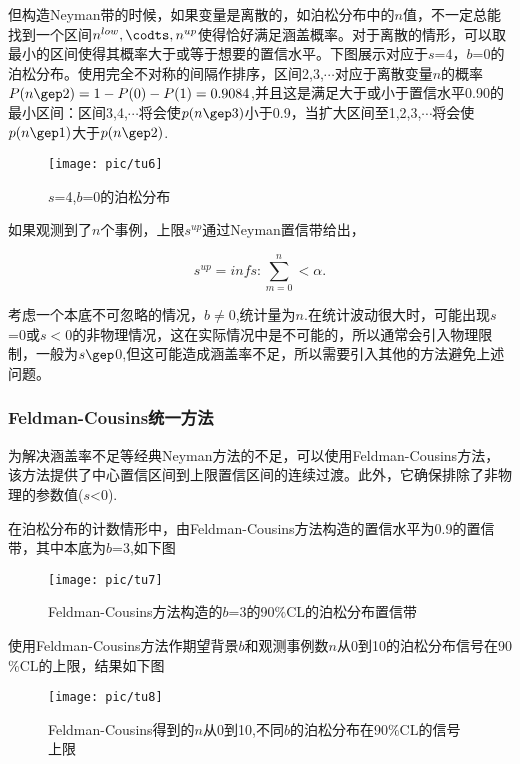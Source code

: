 但构造Neyman带的时候，如果变量是离散的，如泊松分布中的$n$值，不一定总能找到一个区间{$n^{low},\codts,n^{up}$}使得恰好满足涵盖概率。对于离散的情形，可以取最小的区间使得其概率大于或等于想要的置信水平。下图展示对应于$s$=4，$b$=0的泊松分布。使用完全不对称的间隔作排序，区间{2,3,$\cdots$}对应于离散变量$n$的概率$P(n\gep 2)=1-P(0)-P(1)=0.9084$,并且这是满足大于或小于置信水平0.90的最小区间：区间{3,4,$\cdots$}将会使$p(n\gep 3)$小于0.9，当扩大区间至{1,2,3,$\cdots$}将会使$p(n\gep 1)$大于$p(n\gep 2)$.

\begin{figure}[ht]
	\centering
	\texttt{[image: pic/tu6]}
	\caption{$s$=4,$b$=0的泊松分布}
	\label{fig:6}
\end{figure}

如果观测到了$n$个事例，上限$s^{up}$通过Neyman置信带给出，

\begin{equation}\label{key}
s^{up}=inf{s:\sum_{m=0}^{n}<\alpha}.
\end{equation}

考虑一个本底不可忽略的情况，$b\neq$0,统计量为$n$.在统计波动很大时，可能出现$s$=0或$s<$0的非物理情况，这在实际情况中是不可能的，所以通常会引入物理限制，一般为$s\gep$0,但这可能造成涵盖率不足，所以需要引入其他的方法避免上述问题。

\subsubsection{Feldman-Cousins统一方法}

为解决涵盖率不足等经典Neyman方法的不足，可以使用Feldman-Cousins方法，该方法提供了中心置信区间到上限置信区间的连续过渡。此外，它确保排除了非物理的参数值($s$<0).

在泊松分布的计数情形中，由Feldman-Cousins方法构造的置信水平为0.9的置信带，其中本底为$b$=3,如下图

\begin{figure}[ht]
	\centering
	\texttt{[image: pic/tu7]}
	\caption{Feldman-Cousins方法构造的$b$=3的90$\%$CL的泊松分布置信带}
	\label{fig:7}
\end{figure}

使用Feldman-Cousins方法作期望背景$b$和观测事例数$n$从0到10的泊松分布信号在90$\%$CL的上限，结果如下图

\begin{figure}[ht]
	\centering
	\texttt{[image: pic/tu8]}
	\caption{Feldman-Cousins得到的$n$从0到10,不同$b$的泊松分布在90$\%$CL的信号上限}
	\label{fig:8}
\end{figure}

